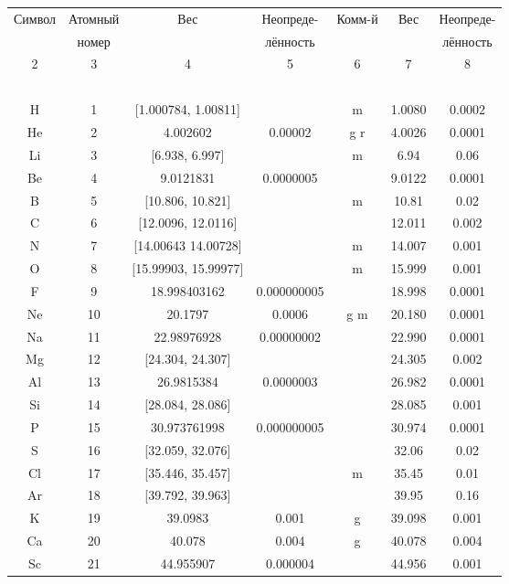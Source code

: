\documentclass[a5paper,openany]{book}
\begin{document}
\begin{table}[h!]
	{\scriptsize 
		\begin{tabular}{ccccccc}
Символ  & Атомный &  Вес  & Неопреде- & Комм-й &  Вес  & Неопреде-  \\
~ & номер &  ~  & лённость &  ~  &  ~  & лённость  \\
\hline 
 2 & 3 & 4 & 5  & 6 & 7 & 8\\
\hline 
~ & ~ & ~ & ~ & ~  & ~ & ~\\
H & 1 & [1.000784, 1.00811] & ~ & m & 1.0080 & 0.0002\\ [1mm]
He & 2 & 4.002602 & 0.00002 &  g r & 4.0026 & 0.0001 \\ [1mm]
Li & 3 & [6.938, 6.997] & ~ & m  & 6.94 & 0.06 \\ [1mm]
Be & 4 & 9.0121831 & 0.0000005 & ~  & 9.0122 & 0.0001 \\ [1mm]
B & 5 & [10.806, 10.821] & ~ & m  & 10.81 & 0.02 \\ [1mm]
C & 6 & [12.0096, 12.0116] & ~ & ~  & 12.011 & 0.002 \\ [1mm]
N & 7 & [14.00643 14.00728] & ~ & m & 14.007 & 0.001 \\ [1mm]
O & 8 & [15.99903, 15.99977] & ~ & m  & 15.999 & 0.001 \\ [1mm]
F & 9 & 18.998403162 & 0.000000005 & ~  & 18.998 & 0.0001 \\ [1mm]
Ne & 10 & 20.1797 & 0.0006 & g m  & 20.180 & 0.0001 \\ [1mm]
Na & 11 & 22.98976928 & 0.00000002 & ~  & 22.990 & 0.0001 \\ [1mm]
Mg & 12 & [24.304, 24.307] & ~ & ~  & 24.305 & 0.002 \\ [1mm]
Al & 13 & 26.9815384 & 0.0000003 & ~  & 26.982 & 0.0001 \\ [1mm]
Si & 14 & [28.084, 28.086] & ~ & ~  & 28.085 & 0.001 \\ [1mm]
P & 15 & 30.973761998 & 0.000000005 & ~  & 30.974 & 0.0001 \\ [1mm]
S & 16 & [32.059, 32.076] & ~ & ~  & 32.06 & 0.02 \\ [1mm]
Cl & 17 & [35.446, 35.457] & ~ & m  & 35.45 & 0.01 \\ [1mm]
Ar & 18 & [39.792, 39.963] & ~ & ~  & 39.95 & 0.16 \\ [1mm]
K & 19 & 39.0983 & 0.001 & g  & 39.098 & 0.001 \\ [1mm]
Ca & 20 & 40.078 & 0.004 & g  & 40.078 & 0.004\\ [1mm]
Sc & 21 & 44.955907 & 0.000004 & ~  & 44.956 & 0.001\\ [1mm]

\end{tabular}}
\end{table}
\end{document}
